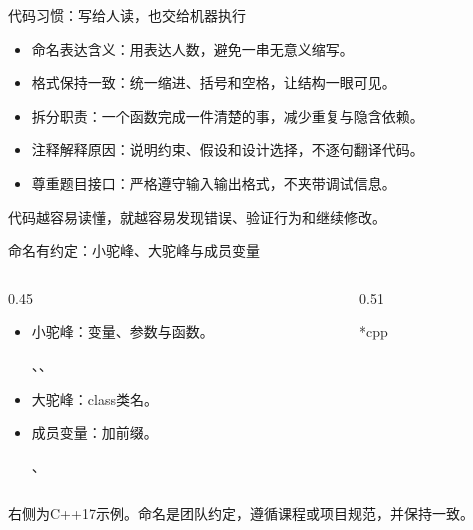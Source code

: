 \begin{frame}{代码习惯：写给人读，也交给机器执行}
    \begin{itemize}
        \item \alert{命名表达含义}：用表达人数，避免一串无意义缩写。
        \item \alert{格式保持一致}：统一缩进、括号和空格，让结构一眼可见。
        \item \alert{拆分职责}：一个函数完成一件清楚的事，减少重复与隐含依赖。
        \item \alert{注释解释原因}：说明约束、假设和设计选择，不逐句翻译代码。
        \item \alert{尊重题目接口}：严格遵守输入输出格式，不夹带调试信息。
    \end{itemize}
    代码越容易读懂，就越容易发现错误、验证行为和继续修改。
\end{frame}

\begin{frame}{命名有约定：小驼峰、大驼峰与成员变量}
    \begin{columns}[c]
        \begin{column}{0.45\textwidth}
            \begin{itemize}
                \item \alert{小驼峰}：变量、参数与函数。\par
                    、、
                \item \alert{大驼峰}：class类名。\par
                \item \alert{成员变量}：加前缀。\par
                    、
            \end{itemize}
        \end{column}
        \begin{column}{0.51\textwidth}
            \begin{Code}*{cpp}
                
            \end{Code}
        \end{column}
    \end{columns}
    \medskip
    右侧为C++17示例。命名是\alert{团队约定}，遵循课程或项目规范，并保持一致。
\end{frame}

